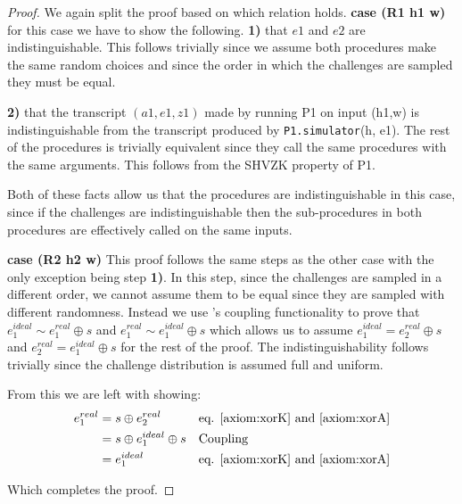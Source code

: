 \begin{proof}
  We again split the proof based on which relation holds.
  \textbf{case (R1 h1 w)} for this case we have to show the following.
  \noindent\textbf{1)} that $e1$ and $e2$ are indistinguishable. This follows
  trivially since we assume both procedures make the same random choices and
  since the order in which the challenges are sampled they must be equal.

  \noindent\textbf{2)} that the transcript $(a1, e1, z1)$ made by running P1 on
  input (h1,w) is indistinguishable from the transcript produced by
  \texttt{P1.simulator}(h, e1). The rest of the procedures is trivially
  equivalent since they call the same procedures with the same arguments.
  This follows from the SHVZK property of P1.

  Both of these facts allow us that the procedures are indistinguishable in this
  case, since if the challenges are indistinguishable then the sub-procedures in
  both procedures are effectively called on the same inputs.

  \noindent\textbf{case (R2 h2 w)} This proof follows the same steps as the
  other case with the only exception being step \textbf{1)}. In this step, since
  the challenges are sampled in a different order, we cannot assume them to be
  equal since they are sampled with different randomness. Instead we use
  \easycrypt's coupling functionality to prove that
  $e_{1}^{ideal} \sim e_{1}^{real} \oplus s$ and
  $e_{1}^{real} \sim e_{1}^{ideal} \oplus s$ which allows us to assume
  $e_{1}^{ideal} = e_{2}^{real} \oplus s$ and
  $e_{2}^{real} = e_{1}^{ideal} \oplus s$ for the rest of the proof.
  The indistinguishability follows trivially since the challenge distribution is
  assumed full and uniform.

  From this we are left with showing:
  \begin{align*}
    e_{1}^{real} &= s \oplus e_{2}^{real} && \text{eq. \ref{axiom:xorK} and \ref{axiom:xorA}} \\
                &= s \oplus e_{1}^{ideal} \oplus s && \text{Coupling} \\
                &= e_{1}^{ideal} && \text{eq. \ref{axiom:xorK} and \ref{axiom:xorA}}
  \end{align*}

  Which completes the proof.
\end{proof}

